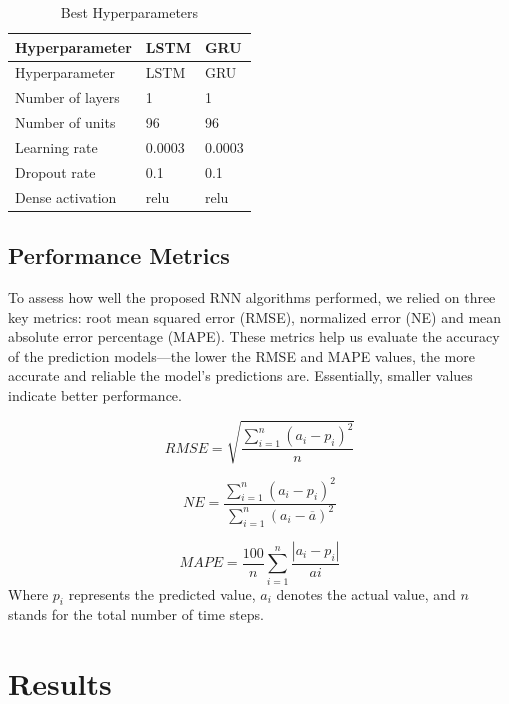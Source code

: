 \documentclass[]{interact}
\theoremstyle{plain}%
\theoremstyle{definition}
\theoremstyle{remark}
\begin{document}
\begin{longtable}[]{@{}lll@{}}
\caption{Best Hyperparameters}\tabularnewline
\toprule\noalign{}
Hyperparameter & LSTM & GRU \\
\midrule\noalign{}
\endfirsthead
\toprule\noalign{}
Hyperparameter & LSTM & GRU \\
\midrule\noalign{}
\endhead
\bottomrule\noalign{}
\endlastfoot
Number of layers & 1 & 1 \\
Number of units & 96 & 96 \\
Learning rate & 0.0003 & 0.0003 \\
Dropout rate & 0.1 & 0.1 \\
Dense activation & relu & relu \\
\end{longtable}

\subsection{Performance Metrics}\label{performance-metrics}

To assess how well the proposed RNN algorithms performed, we relied on
three key metrics: root mean squared error (RMSE), normalized error (NE)
and mean absolute error percentage (MAPE). These metrics help us
evaluate the accuracy of the prediction models---the lower the RMSE and
MAPE values, the more accurate and reliable the model's predictions are.
Essentially, smaller values indicate better performance.

\begin{equation}
RMSE = \sqrt{\dfrac{\displaystyle{\sum_{i=1}^n (a_i-p_i)^2}}{n} }
\end{equation}

\begin{equation}
NE = \dfrac{\displaystyle{\sum_{i=1}^n (a_i-p_i)^2}}{\displaystyle{\sum_{i=1}^n (a_i-\overline{a})^2}}
\end{equation}

\begin{equation}
MAPE = \dfrac{100}{n}\sum_{i=1}^n \dfrac{|a_i-p_i|}{ai}
\end{equation} Where \(p_i\) represents the predicted value, \(a_i\)
denotes the actual value, and \(n\) stands for the total number of time
steps.

\section{Results}\label{results}
\end{document}
